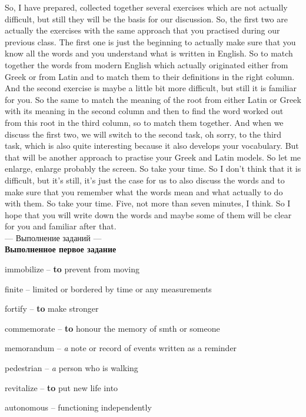 \documentclass[main.tex]{subfiles}
\begin{document}

So, I have prepared, collected together several exercises which are not actually difficult, but still they will be the basis for our discussion.
So, the first two are actually the exercises with the same approach that you practised during our previous class.
The first one is just the beginning to actually make sure that you know all the words and you understand what is written in English.
So to match together the words from modern English which actually originated either from Greek or from Latin and to match them to their definitions in the right column.
And the second exercise is maybe a little bit more difficult, but still it is familiar for you.
So the same to match the meaning of the root from either Latin or Greek with its meaning in the second column and then to find the word worked out from this root in the third column, so to match them together.
And when we discuss the first two, we will switch to the second task, oh sorry, to the third task, which is also quite interesting because it also develops your vocabulary.
But that will be another approach to practise your Greek and Latin models.
So let me enlarge, enlarge probably the screen.
So take your time.
So I don't think that it is difficult, but it's still, it's just the case for us to also discuss the words and to make sure that you remember what the words mean and what actually to do with them.
So take your time.
Five, not more than seven minutes, I think.
So I hope that you will write down the words and maybe some of them will be clear for you and familiar after that.
\\

--- Выполнение заданий ---
\\

\textbf{Выполненное первое задание}

immobilize -- \textbf{to} prevent from moving

finite -- limited or bordered by time or any measurements

fortify -- \textbf{to} make stronger

commemorate -- \textbf{to} honour the memory of smth or someone

memorandum -- \textit{a} note or record of events written as a reminder

pedestrian -- \textit{a} person who is walking

revitalize -- \textbf{to} put new life into

autonomous -- functioning independently
\end{document}
